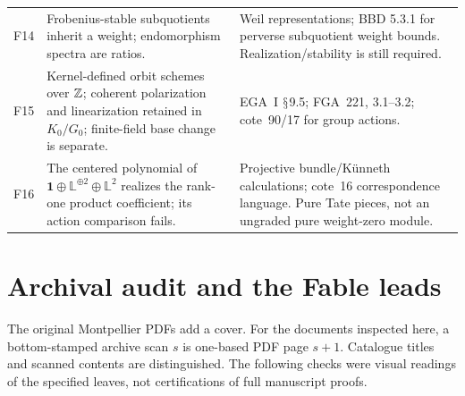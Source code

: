 \documentclass[11pt,a4paper]{article}
\renewcommand{\S}{\ensuremath{\mathsection}}
\theoremstyle{named}\newtheorem{finding}{Finding}[section]
\theoremstyle{definition}\newtheorem{definition}[finding]{Definition}
\theoremstyle{remark}\newtheorem{remark}[finding]{Remark}
\begin{document}
{\begin{longtable}{p{.12\linewidth}p{.48\linewidth}p{.32\linewidth}}
F14&Frobenius-stable subquotients inherit a weight; endomorphism spectra are ratios.&Weil representations; BBD 5.3.1 for perverse subquotient weight bounds. Realization/stability is still required.\\
F15&Kernel-defined orbit schemes over $\mathbb Z$; coherent polarization and linearization retained in $K_0/G_0$; finite-field base change is separate.&EGA~I \S9.5; FGA~221, 3.1--3.2; cote~90/17 for group actions.\\
F16&The centered polynomial of $\mathbf1\oplus\mathbb L^{\oplus2}\oplus\mathbb L^2$ realizes the rank-one product coefficient; its action comparison fails.&Projective bundle/K\"unneth calculations; cote~16 correspondence language. Pure Tate pieces, not an ungraded pure weight-zero module.\\\bottomrule
\end{longtable}}

\section{Archival audit and the Fable leads}\label{sec:archive}
The original Montpellier PDFs add a cover. For the documents inspected here, a bottom-stamped archive scan $s$ is one-based PDF page $s+1$. Catalogue titles and scanned contents are distinguished. The following checks were visual readings of the specified leaves, not certifications of full manuscript proofs.
\end{document}
